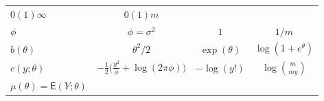 \documentclass[12pt,a4paper,UTF8,twoside]{book}
\theoremstyle{definition}
\theoremstyle{definition}
\theoremstyle{definition}
\theoremstyle{remark}
\begin{document}
\begin{longtable}[]{@{}lccc@{}}
\begin{minipage}[t]{0.22\columnwidth}
\(0(1)\infty\)\strut
\end{minipage} & \begin{minipage}[t]{0.22\columnwidth}\centering
\(0(1)m\)\strut
\end{minipage}\tabularnewline
\begin{minipage}[t]{0.21\columnwidth}\raggedright
\(\phi\)\strut
\end{minipage} & \begin{minipage}[t]{0.22\columnwidth}\centering
\(\phi = \sigma^2\)\strut
\end{minipage} & \begin{minipage}[t]{0.22\columnwidth}\centering
\(1\)\strut
\end{minipage} & \begin{minipage}[t]{0.22\columnwidth}\centering
\(1/m\)\strut
\end{minipage}\tabularnewline
\begin{minipage}[t]{0.21\columnwidth}\raggedright
\(b(\theta)\)\strut
\end{minipage} & \begin{minipage}[t]{0.22\columnwidth}\centering
\(\theta^2/2\)\strut
\end{minipage} & \begin{minipage}[t]{0.22\columnwidth}\centering
\(\exp(\theta)\)\strut
\end{minipage} & \begin{minipage}[t]{0.22\columnwidth}\centering
\(\log(1+e^{\theta})\)\strut
\end{minipage}\tabularnewline
\begin{minipage}[t]{0.21\columnwidth}\raggedright
\(c(y;\theta)\)\strut
\end{minipage} & \begin{minipage}[t]{0.22\columnwidth}\centering
\(-\frac{1}{2}\big( \frac{y^2}{\phi} + \log(2\pi\phi) \big)\)\strut
\end{minipage} & \begin{minipage}[t]{0.22\columnwidth}\centering
\(-\log(y!)\)\strut
\end{minipage} & \begin{minipage}[t]{0.22\columnwidth}\centering
\(\log\binom{m}{my}\)\strut
\end{minipage}\tabularnewline
\begin{minipage}[t]{0.21\columnwidth}\raggedright
\(\mu(\theta) = \mathsf{E}(Y;\theta)\)\strut
\end{minipage} & \begin{minipage}[t]{0.22\columnwidth}\centering

\end{minipage}
\end{longtable}
\end{document}
